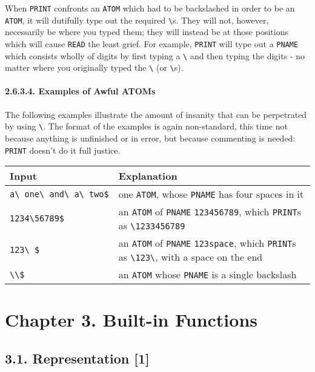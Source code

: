 \documentclass[a4paper,]{article}
\let\oldparagraph\paragraph
\renewcommand{\paragraph}[1]{\oldparagraph{#1}\mbox{}}
\begin{document}
When \texttt{PRINT} confronts an \texttt{ATOM} which had to be backslashed in order to be an \texttt{ATOM}, it will
dutifully type out the required \texttt{\textbackslash{}}s. They will not, however, necessarily be where you typed them;
they will instead be at those positions which will cause \texttt{READ} the least grief. For example, \texttt{PRINT} will
type out a \texttt{PNAME} which consists wholly of digits by first typing a \texttt{\textbackslash{}} and then typing the
digits - no matter where you originally typed the \texttt{\textbackslash{}} (or \texttt{\textbackslash{}}s).

\paragraph{2.6.3.4. Examples of Awful ATOMs}\label{examples-of-awful-atoms}

The following examples illustrate the amount of insanity that can be perpetrated by using \texttt{\textbackslash{}}. The
format of the examples is again non-standard, this time not because anything is unfinished or in error, but because
commenting is needed: \texttt{PRINT} doesn't do it full justice.

\begin{longtable}[]{@{}ll@{}}
\toprule
Input & Explanation\tabularnewline
\midrule
\endhead
\texttt{a\textbackslash{}\ one\textbackslash{}\ and\textbackslash{}\ a\textbackslash{}\ two\$} & one \texttt{ATOM}, whose
\texttt{PNAME} has four spaces in it\tabularnewline
\texttt{1234\textbackslash{}56789\$} & an \texttt{ATOM} of \texttt{PNAME} \texttt{123456789}, which \texttt{PRINT}s as
\texttt{\textbackslash{}1233456789}\tabularnewline
\texttt{123\textbackslash{}\ \$} & an \texttt{ATOM} of \texttt{PNAME} \texttt{123space}, which \texttt{PRINT}s as
\texttt{\textbackslash{}123\textbackslash{}}, with a space on the end\tabularnewline
\texttt{\textbackslash{}\textbackslash{}\$} & an \texttt{ATOM} whose \texttt{PNAME} is a single backslash\tabularnewline
\bottomrule
\end{longtable}

\section{Chapter 3. Built-in Functions}\label{chapter-3.-built-in-functions}

\subsection{3.1. Representation {[}1{]}}\label{representation-1}
\end{document}
